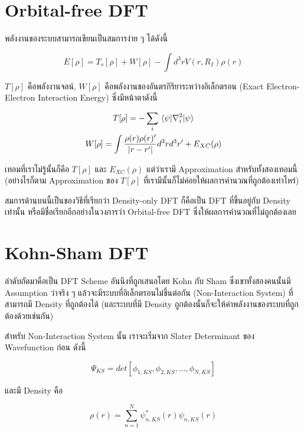 \section{Orbital-free DFT}

พลังงานของระบบสามารถเขียนเป็นสมการง่าย ๆ ได้ดังนี้

\begin{equation}
    E[\rho] = T_{s}[\rho] + W[\rho] - \int d^{3} r V(r,R_{I}) \rho(r)
\end{equation}

\noindent $T[\rho]$ คือพลังงานจลน์, $W[\rho]$ คือพลังงานของอันตรกิริยาระหว่างอิเล็กตรอน
(Exact Electron-Electron Interaction Energy) ซึ่งมีหน้าตาดังนี้

\begin{gather}
    T[\rho] = -\sum_{i} \mel{\psi}{\nabla^{2}_{i}}{\psi} \\
    W[\rho] = \int \frac{\rho(r)\rho(r)'}{|r-r'|} d^{3} r d^{3} r' + E_{XC}(\rho)
\end{gather}

เทอมที่เราไม่รู้นั้นก็คือ $T[\rho]$ และ  $E_{XC}(\rho)$ แต่ว่าเรามี Approximation สำหรับทั้งสองเทอมนี้
(อย่างไรก็ตาม Approximation ของ $T[\rho]$ ที่เรามีนั้นก็ไม่ค่อยให้ผลการคำนวณที่ถูกต้องเท่าไหร่)

สมการด้านบนนี้เป็นของวิธีที่เรียกว่า Density-only DFT ก็คือเป็น DFT ที่ขึ้นอยู่กับ Density เท่านั้น
หรือมีชื่อเรียกอีกอย่างในวงการว่า Orbital-free DFT ซึ่งให้ผลการคำนวณที่ไม่ถูกต้องเลย

\section{Kohn-Sham DFT}

ลำดับถัดมาคือเป็น DFT Scheme อันนึงที่ถูกเสนอโดย Kohn กับ Sham ซึ่งเขาทั้งสองคนนั้นมี Assumption
ว่าจริง ๆ แล้วจะมีระบบที่อิเล็กตรอนไม่ขึ้นต่อกัน (Non-Interaction System) ที่สามารถมี Density
ที่ถูกต้องได้ (และระบบที่มี Density ถูกต้องนั้นก็จะให้ค่าพลังงานของระบบที่ถูกต้องด้วยเช่นกัน)

สำหรับ Non-Interaction System นั้น เราจะเริ่มจาก Slater Determinant ของ Wavefunction
ก่อน ดังนี้

\begin{equation}
    \Psi_{KS} = det[\phi_{1,KS}, \phi_{2,KS}, \dots, \phi_{N,KS}]
\end{equation}

\noindent และมี Density คือ

\begin{equation}
    \rho(r) = \sum^{N}_{n=1} \psi_{n,KS}^{\ast}(r) \psi_{n,KS}(r)
\end{equation}

